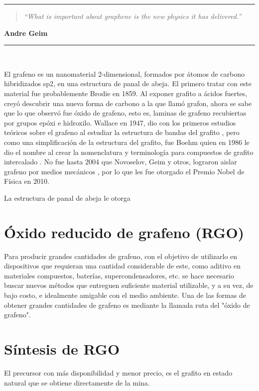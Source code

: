 \noindent
\rule{\linewidth}{1 pt}
\begin{flushright}
	\begin{quotation}
		\small{
			\textit{``What is important about graphene is the new physics it has delivered.''}}
	\end{quotation}
	\bf{Andre Geim}
\end{flushright}
\noindent
\rule{\linewidth}{1 pt}\\
\vfill

El grafeno es un nanomaterial 2-dimensional, formados por átomos de carbono  hibridizados sp2, en una estructura de panal de abeja. El primero tratar con este material fue probablemente Brodie en 1859. Al exponer grafito a ácidos fuertes, creyó descubrir una nueva forma de carbono a la que llamó grafon, ahora se sabe que lo que observó fue óxido de grafeno, esto es, laminas de grafeno recubiertas por grupos epóxi e hidroxilo\cite{Geim2012}. Wallace en 1947, dio con los primeros estudios teóricos sobre el grafeno al estudiar la estructura de bandas del grafito \cite{Wallace1947}, pero como una simplificación de la estructura del grafito, fue Boehm quien en 1986 le dio el nombre al crear la nomenclatura y terminología para compuestos de grafito intercalado \cite{Boehm1986}. No fue hasta 2004 que Novoselov, Geim y otros, lograron aislar grafeno por medios mecánicos \cite{Novoselov2004}, por lo que les fue otorgado el Premio Nobel de Física en 2010.

La estructura de panal de abeja le otorga

\section{Óxido reducido de grafeno (RGO)}
Para producir grandes cantidades de grafeno, con el objetivo de utilizarlo en dispositivos que requieran una cantidad considerable de este, como aditivo en materiales compuestos, baterías, supercondensadores, etc. se hace necesario buscar nuevos métodos que entreguen suficiente material utilizable, y a su vez, de bajo costo, e idealmente amigable con el medio ambiente.
Una de las formas de obtener grandes cantidades de grafeno es mediante la llamada ruta del "óxido de grafeno".

\section{Síntesis de RGO}
El precursor con más disponibilidad y menor precio, es el grafito en estado natural que se obtiene directamente de la mina.

